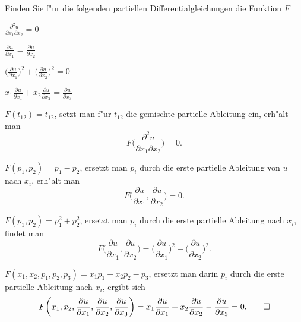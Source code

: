 Finden Sie f"ur die folgenden partiellen Differentialgleichungen die
Funktion $F$
\begin{teilaufgaben}
\item $\displaystyle\frac{\partial^2 u}{\partial x_1\partial x_2}=0$
\item $\displaystyle\frac{\partial u}{\partial x_1}=\frac{\partial u}{\partial x_2}$
\item $\displaystyle
\biggl(\frac{\partial u}{\partial x_1}\biggr)^2+
\biggl(\frac{\partial u}{\partial x_2}\biggr)^2=0$
\item $\displaystyle
x_1\frac{\partial u}{\partial x_1}+
x_2\frac{\partial u}{\partial x_2}=\frac{\partial u}{\partial x_3}$
\end{teilaufgaben}

\begin{loesung}
\begin{teilaufgaben}
\item $F(t_{12})=t_{12}$, setzt man f"ur $t_{12}$ die gemischte partielle
Ableitung ein, erh"alt man
\[
F\biggl(\frac{\partial^2 u}{\partial x_1\partial x_2}\biggr)=0.
\]
\item
$F(p_1,p_2)=p_1-p_2$, ersetzt man $p_i$ durch die erste 
partielle Ableitung von $u$ nach $x_i$, erh"alt man
\[
F\biggl(\frac{\partial u}{\partial x_1},\frac{\partial u}{\partial x_2}\biggr)=0.
\]
\item
$F(p_1,p_2)=p_1^2+p_2^2$, ersetzt man $p_i$ durch die erste partielle
Ableitung nach $x_i$, findet man
\[
F\biggl(
\frac{\partial u}{\partial x_1},
\frac{\partial u}{\partial x_2}
\biggr)
=
\biggl(\frac{\partial u}{\partial x_1}\biggr)^2+
\biggl(\frac{\partial u}{\partial x_2}\biggr)^2.
\]
\item
$F(x_1,x_2,p_1,p_2,p_3)=x_1p_1+x_2p_2-p_3$, ersetzt man darin $p_i$ durch
die erste partielle Ableitung nach $x_i$, ergibt sich
\[
F\biggl(x_1,x_2,
\frac{\partial u}{\partial x_1},
\frac{\partial u}{\partial x_2},
\frac{\partial u}{\partial x_3}\biggr)=
x_1\frac{\partial u}{\partial x_1}+
x_2\frac{\partial u}{\partial x_2}-\frac{\partial u}{\partial x_3}=0.
\qedhere
\]
\end{teilaufgaben}
\end{loesung}
